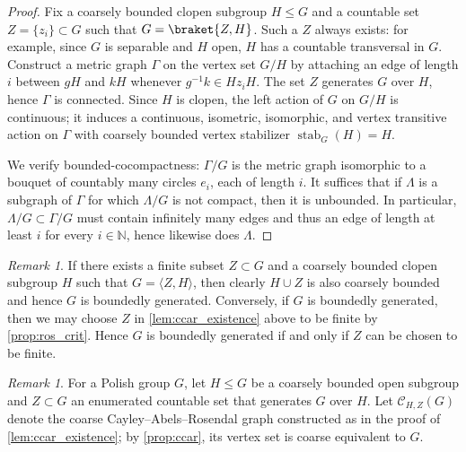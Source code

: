 \documentclass[twoside]{amsart}
\theoremstyle{plain}
\theoremstyle{break}
\theoremstyle{definition}
\theoremstyle{remark}
\newtheorem{remark*}[theorem]{Remark}
\newcommand{\N}{\mathbb{N}}
\DeclareMathOperator{\stab}{stab}
\newcommand{\cc}{\mathcal C}
\begin{document}
\begin{proof}
  Fix a coarsely bounded clopen subgroup $H \leq G$ and a countable
  set $Z = \{z_i\}\subset G$ such that $G = \braket{Z,H}$.
  Such a $Z$ always exists: for example, since $G$ is separable
  and $H$ open, $H$ has a countable
  transversal in $G$. 
  Construct a metric graph $\Gamma$
  on the vertex set $G / H$ by attaching an edge of length $i$
  between $g H$ and $k H$ whenever $g^{-1}k \in Hz_i H$. The set
  $Z$ generates $G$ over $H$, hence $\Gamma$ is connected.
  Since $H$ is clopen, the left action of $G$ on %
  $G/H$ is continuous; 
  it induces a continuous, isometric, isomorphic, and
  vertex transitive action on $\Gamma$ with coarsely bounded vertex
  stabilizer $\stab_G(H) = H$.

  We verify bounded-cocompactness: $\Gamma / G$ is the metric
  graph isomorphic to a bouquet of countably many circles $e_i$, each of
  length $i$.  It suffices that 
  if $\Lambda$ is a subgraph of $\Gamma$ for which $\Lambda/G$ is
  not compact, then it is unbounded.  In particular, 
  $\Lambda/G \subset \Gamma / G$ must contain 
  infinitely many edges and thus an edge of length at least
  $i$ for every $i \in \N$, hence likewise does $\Lambda$.  
\end{proof}

\begin{remark*}\label{rmk:bdgen_finiteZ}
    If there exists a finite subset $Z\subset G$ and a coarsely 
    bounded clopen subgroup $H$ such that 
    $G=\langle Z ,H\rangle$, then clearly $H\cup Z$ is 
    also coarsely bounded and hence $G$ is boundedly generated. 
    Conversely, if $G$ is boundedly generated, then we may choose $Z$ 
    in \cref{lem:ccar_existence} above 
    to be finite by \cref{prop:ros_crit}. 
    Hence $G$ is boundedly generated if and only if $Z$ can be chosen to be finite.
\end{remark*}

\begin{remark*}\label{rmk:ccar_build}
  For a Polish group $G$, let $H \leq G$ be a coarsely bounded
  open subgroup and $Z \subset G$ an enumerated countable set that generates $G$
  over $H$.  Let $\cc_{H,Z}(G)$ denote the coarse
  Cayley--Abels--Rosendal graph constructed as in the proof of
  \cref{lem:ccar_existence}; by \cref{prop:ccar}, its
  vertex set is coarse equivalent to $G$.
\end{remark*}
\end{document}
